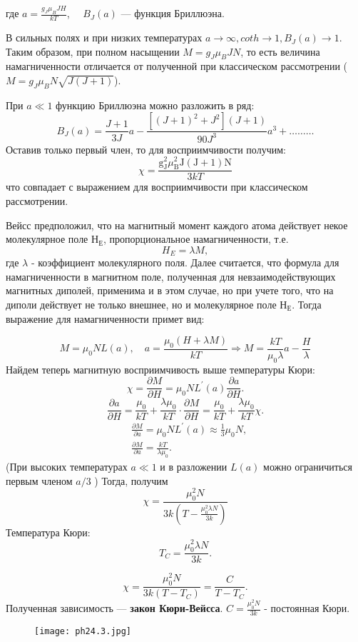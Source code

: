\noindent где $a = \frac{g_J \mu_B J H}{kT}$, $\quad B_J(a)$ --- функция Бриллюэна.

В сильных полях и при низких температурах $a\rightarrow \infty, coth \rightarrow 1, B_J(a)\rightarrow 1$. Таким образом, при полном насыщении $M = g_J \mu_B J N $, то есть величина намагниченности отличается от полученной при классическом рассмотрении ($M=g_J \mu_B N \sqrt{J(J+1)}$).


При $a \ll 1$ функцию Бриллюэна можно разложить в ряд:
$$
B_J(a)=\frac{J+1}{3 J} a-\frac{\left[(J+1)^2+J^2\right](J+1)}{90 J^3} a^3+\ldots \ldots \ldots
$$
Оставив только первый член, то для восприимчивости получим: $$
\chi=\frac{\mathrm{g}_{\mathrm{J}}^2 \mu_{\mathrm{B}}^2 \mathrm{J}(\mathrm{J}+1) \mathrm{N}}{3 k T}
$$
что совпадает с выражением для восприимчивости при классическом рассмотрении.

Вейсс предположил, что на магнитный момент каждого атома действует некое
молекулярное поле $Н_{Е}$, пропорциональное намагниченности, т.е.
$$
H_E=\lambda M,
$$
где $\lambda$ - коэффициент молекулярного поля. Далее считается, что формула для
намагниченности в магнитном поле, полученная для невзаимодействующих
магнитных диполей, применима и в этом случае, но при учете того, что на
диполи действует не только внешнее, но и молекулярное поле  $Н_{Е}$. Тогда выражение для намагниченности примет вид:

$$
M=\mu_0 N L(a), \quad
a=\frac{\mu_0(H+\lambda M)}{k T}
 \Rightarrow
M=\frac{k T}{\mu_0 \lambda} a-\frac{H}{\lambda}
$$
Найдем теперь магнитную восприимчивость выше температуры Кюри:
$$
\chi=\frac{\partial M}{\partial H}=\mu_0 N L^{\prime}(a) \frac{\partial a}{\partial H}.
$$
$$
\frac{\partial a}{\partial H}=\frac{\mu_0}{k T}+\frac{\lambda \mu_0}{k T} \cdot \frac{\partial M}{\partial H}=\frac{\mu_0}{k T}+\frac{\lambda \mu_0}{k T} \chi.
$$
$$
\begin{aligned}
& \frac{\partial M}{\partial a}=\mu_0 N L^{\prime}(a) \approx \frac{1}{3} \mu_0 N, \\
& \frac{\partial M}{\partial a}=\frac{k T}{\lambda \mu_0}.
\end{aligned}
$$
(При высоких температурах $a \ll 1$ и в разложении $L(a)$ можно ограничиться первым членом $a / 3$ ) Тогда, получим
$$
\chi=\frac{\mu_0^2 N}{3 k\left(T-\frac{\mu_0^2 \lambda N}{3 k}\right)}
$$
Температура Кюри:
$$
T_C=\frac{\mu_0^2 \lambda N}{3 k}.
$$

$$
\chi=\frac{\mu_0^2 N}{3 k\left(T-T_C\right)}=\frac{C}{T-T_C}.
$$
Полученная зависимость --- \textbf{закон Кюри-Вейсса}. $C=\frac{\mu_0^2 N}{3 k}$ - постоянная Кюри.
\begin{figure}[h!]
\centering
    \texttt{[image: ph24.3.jpg]}
\end{figure}



